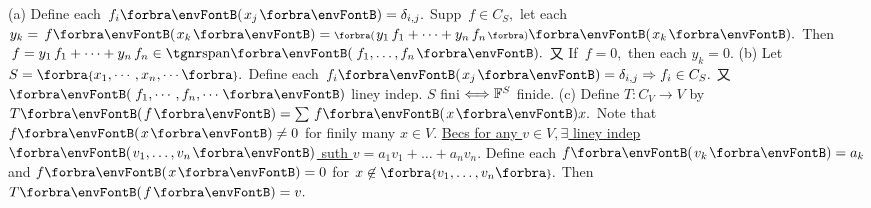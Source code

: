 (a) Define each $\,f_i\Par{x_j}=\delta_{i,j}.$ Supp $\,f\in C_S,$ let each $y_k=\,f\Par{x_k}=\BigPar{y_1\,f_1+\dots+y_n\,f_n}\Par{x_k}.$\parSol{\Ha}
Then $\,f=y_1\,f_1+\dots+y_n\,f_n\in\Span{\,f_1,\dots,f_n}.$ 又 If $\,f=0,$ then each $y_k=0.$\vspace{3pt}\parSol{}
(b) Let $S=\Bra{x_1,\cdots,x_n,\cdots}.$ Define each $\,f_i\Par{x_j}=\delta_{i,j}\Rightarrow f_i\in C_S.$ 又 $\Par{\,f_1,\cdots,f_n,\cdots}$ liney indep.\parSol{\Hb}
\ACoro $S$ fini $\Longleftrightarrow{\mathbb{F}}^S$ finide.\vspace{3pt}\parSol{}
(c) Define $T:C_V\rightarrow V$ by $T\Par{f}=\sum\,f\Par{x}x.$ Note that $f\Par{x}\neq0$ for finily many $x\in V.$\parSol{\Hc}
\uline{Becs for any $v\in V,\exists$ liney indep $\Par{v_1,\dots,v_n}$ suth $v=a_1v_1+\dots+a_nv_n.$} \parSol{\Hc}
Define each $f\Par{v_k}=a_k$ and $f\Par{x}=0$ for $x\not\in\Bra{v_1,\dots,v_n}.$ Then $T\Par{f}=v.$\PfEnd
\SepLine


